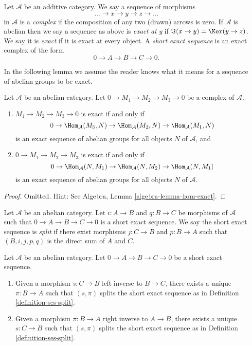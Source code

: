 \begin{definition}
\label{definition-exact}
Let $\mathcal{A}$ be an additive category.
We say a sequence of morphisms
$$
\ldots \to x \to y \to z \to \ldots
$$
in $\mathcal{A}$
is a {\it complex} if the composition of any two (drawn)
arrows is zero. If $\mathcal{A}$ is abelian then
we say a sequence as above is {\it exact at $y$} if
$\Im(x \to y) = \Ker(y \to z)$. We say it is {\it exact}
if it is exact at every object. A {\it short exact sequence}
is an exact complex of the form
$$
0 \to A  \to B \to C \to 0.
$$
\end{definition}

\noindent
In the following lemma we assume the reader knows what it means
for a sequence of abelian groups to be exact.

\begin{lemma}
\label{lemma-check-exactness}
Let $\mathcal{A}$ be an abelian category.
Let $0 \to M_1 \to M_2 \to M_3 \to 0$ be a complex of $\mathcal{A}$.
\begin{enumerate}
\item $M_1 \to M_2 \to M_3 \to 0$ is exact if and only if
$$
0 \to \Hom_\mathcal{A}(M_3, N) \to
\Hom_\mathcal{A}(M_2, N) \to \Hom_\mathcal{A}(M_1, N)
$$
is an exact sequence of abelian groups for all objects $N$ of
$\mathcal{A}$, and
\item $0 \to M_1 \to M_2 \to M_3$ is exact if and only if
$$
0 \to \Hom_\mathcal{A}(N, M_1) \to \Hom_\mathcal{A}(N, M_2) \to
\Hom_\mathcal{A}(N, M_1)
$$
is an exact sequence of abelian groups for all objects $N$ of $\mathcal{A}$.
\end{enumerate}
\end{lemma}

\begin{proof}
Omitted. Hint: See
Algebra, Lemma \ref{algebra-lemma-hom-exact}.
\end{proof}

\begin{definition}
\label{definition-ses-split}
Let $\mathcal{A}$ be an abelian category.
Let $i : A \to B$ and $q : B \to C$ be morphisms
of $\mathcal{A}$ such that
$0 \to A \to B \to C \to 0$ is a short
exact sequence. We say the short exact
sequence is {\it split} if there exist
morphisms $j : C \to B$ and $p : B \to A$ such
that $(B, i, j, p, q)$ is the direct sum of $A$ and $C$.
\end{definition}

\begin{lemma}
\label{lemma-ses-split}
Let $\mathcal{A}$ be an abelian category.
Let $0 \to A \to B \to C \to 0$
be a short exact sequence.
\begin{enumerate}
\item Given a morphism $s : C \to B$ left inverse to
$B \to C$, there exists a unique $\pi : B \to A$
such that $(s, \pi)$ splits the short exact sequence
as in Definition \ref{definition-ses-split}.
\item Given a morphism $\pi : B \to A$ right inverse to
$A \to B$, there exists a unique $s : C \to B$
such that $(s, \pi)$ splits the short exact sequence
as in Definition \ref{definition-ses-split}.
\end{enumerate}
\end{lemma}

